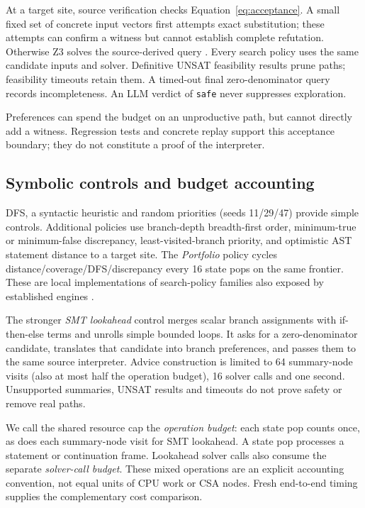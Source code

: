 \documentclass[sigconf]{acmart}
\begin{document}
At a target site, source verification checks Equation~\ref{eq:acceptance}.
A small fixed set of concrete input vectors first attempts exact substitution;
these attempts can confirm a witness but cannot establish complete refutation.
Otherwise Z3 solves the source-derived query \cite{z3}. Every search policy
uses the same candidate inputs and solver. Definitive UNSAT feasibility
results prune paths; feasibility timeouts retain them. A timed-out final
zero-denominator query records incompleteness. An LLM verdict of \texttt{safe}
never suppresses exploration.

Preferences can spend the budget on an unproductive path, but cannot directly
add a witness. Regression tests and concrete replay support this acceptance
boundary; they do not constitute a proof of the interpreter.

\subsection{Symbolic controls and budget accounting}
DFS, a syntactic heuristic and random priorities (seeds 11/29/47) provide
simple controls. Additional policies use branch-depth breadth-first order,
minimum-true or minimum-false discrepancy, least-visited-branch priority, and
optimistic AST statement distance to a target site. The \emph{Portfolio}
policy cycles distance/coverage/DFS/discrepancy every 16 state pops on the
same frontier. These are local implementations of search-policy families
also exposed by established engines \cite{klee-options}.

The stronger \emph{SMT lookahead} control merges scalar branch assignments
with if-then-else terms and unrolls simple bounded loops. It asks for a
zero-denominator candidate, translates that candidate into branch
preferences, and passes them to the same source interpreter. Advice
construction is limited to 64 summary-node visits (also at most half the
operation budget), 16 solver calls and one second. Unsupported summaries,
UNSAT results and timeouts do not prove safety or remove real paths.

We call the shared resource cap the \emph{operation budget}: each state pop
counts once, as does each summary-node visit for SMT lookahead. A state pop
processes a statement or continuation frame. Lookahead solver calls also
consume the separate \emph{solver-call budget}. These mixed operations are
an explicit accounting convention, not equal units of CPU work or CSA
nodes. Fresh end-to-end timing supplies the complementary cost comparison.
\end{document}
